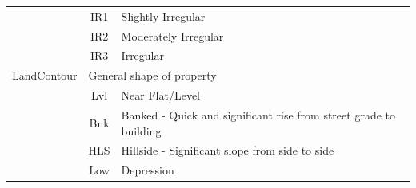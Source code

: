 \documentclass[11pt]{scrartcl} %
\begin{document}
\begin{center}
\begin{tabular}{c c c c c c}
\multicolumn{2}{|c}{} & \multicolumn{1}{c}{IR1} & \multicolumn{3}{l|}{Slightly Irregular}\\
\multicolumn{2}{|c}{} & \multicolumn{1}{c}{IR2} & \multicolumn{3}{l|}{Moderately Irregular}\\
\multicolumn{2}{|c}{} & \multicolumn{1}{c}{IR3} & \multicolumn{3}{l|}{Irregular}\\
\hline
\multicolumn{2}{|c}{LandContour} & \multicolumn{4}{l|}{General shape of property}\\ 
\multicolumn{2}{|c}{} & \multicolumn{1}{c}{Lvl} & \multicolumn{3}{l|}{Near Flat/Level}\\
\multicolumn{2}{|c}{} & \multicolumn{1}{c}{Bnk} & \multicolumn{3}{l|}{Banked - Quick and significant rise from street grade to building}\\
\multicolumn{2}{|c}{} & \multicolumn{1}{c}{HLS} & \multicolumn{3}{l|}{Hillside - Significant slope from side to side}\\
\multicolumn{2}{|c}{} & \multicolumn{1}{c}{Low} & \multicolumn{3}{l|}{Depression}\\
\hline
\end{tabular}
\end{center}
\end{document}
